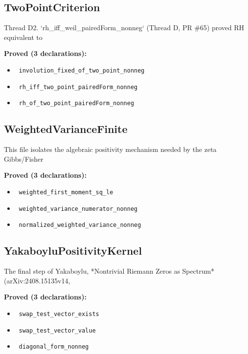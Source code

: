 \documentclass{report}
\theoremstyle{definition}
\begin{document}
\subsection{TwoPointCriterion}
Thread D2. `rh\_iff\_weil\_pairedForm\_nonneg` (Thread D, PR \#65) proved RH equivalent to

\noindent\textbf{Proved (3 declarations):}
\begin{itemize}
  \item {}\leanok\ \texttt{involution\_fixed\_of\_two\_point\_nonneg}
  \item {}\leanok\ \texttt{rh\_iff\_two\_point\_pairedForm\_nonneg}
  \item {}\leanok\ \texttt{rh\_of\_two\_point\_pairedForm\_nonneg}
\end{itemize}

\subsection{WeightedVarianceFinite}
This file isolates the algebraic positivity mechanism needed by the zeta Gibbs/Fisher

\noindent\textbf{Proved (3 declarations):}
\begin{itemize}
  \item {}\leanok\ \texttt{weighted\_first\_moment\_sq\_le}
  \item {}\leanok\ \texttt{weighted\_variance\_numerator\_nonneg}
  \item {}\leanok\ \texttt{normalized\_weighted\_variance\_nonneg}
\end{itemize}

\subsection{YakaboyluPositivityKernel}
The final step of Yakaboylu, *Nontrivial Riemann Zeros as Spectrum* (arXiv:2408.15135v14,

\noindent\textbf{Proved (3 declarations):}
\begin{itemize}
  \item {}\leanok\ \texttt{swap\_test\_vector\_exists}
  \item {}\leanok\ \texttt{swap\_test\_vector\_value}
  \item {}\leanok\ \texttt{diagonal\_form\_nonneg}
\end{itemize}
\end{document}
